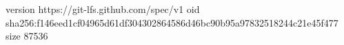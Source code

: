 version https://git-lfs.github.com/spec/v1
oid sha256:f146eed1cf04965d61df304302864586d46bc90b95a97832518244c21e45f477
size 87536

